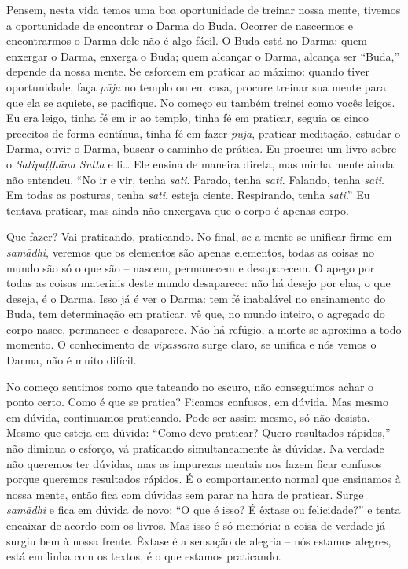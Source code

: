 Pensem, nesta vida temos uma boa oportunidade de treinar nossa
mente, tivemos a oportunidade de encontrar o Darma do Buda. Ocorrer de
nascermos e encontrarmos o Darma dele não é algo fácil. O Buda está no
Darma: quem enxergar o Darma, enxerga o Buda; quem alcançar o Darma,
alcança ser “Buda,” depende da nossa mente. Se esforcem em praticar ao
máximo: quando tiver oportunidade, faça \emph{pūja} no templo ou em
casa, procure treinar sua mente para que ela se aquiete, se pacifique.
No começo eu também treinei como vocês leigos. Eu era leigo, tinha fé
em ir ao templo, tinha fé em praticar, seguia os cinco preceitos de
forma contínua, tinha fé em fazer \emph{pūja}, praticar meditação,
estudar o Darma, ouvir o Darma, buscar o caminho de prática. Eu
procurei um livro sobre o \emph{Satipaṭṭhāna Sutta} e li\ldots{} Ele
ensina de maneira direta, mas minha mente ainda não entendeu. “No ir e
vir, tenha \emph{sati}. Parado, tenha \emph{sati}. Falando, tenha
\emph{sati}. Em todas as posturas, tenha \emph{sati}, esteja
ciente. Respirando, tenha \emph{sati}.” Eu tentava praticar, mas
ainda não enxergava que o corpo é apenas corpo. 

Que fazer? Vai praticando, praticando. No final, se a mente se
unificar firme em \emph{samādhi}, veremos que os elementos são
apenas elementos, todas as coisas no mundo são só o que são – nascem,
permanecem e desaparecem. O apego por todas as coisas materiais deste
mundo desaparece: não há desejo por elas, o que deseja, é o Darma. Isso
já é ver o Darma: tem fé inabalável no ensinamento do Buda, tem
determinação em praticar, vê que, no mundo inteiro, o agregado do corpo
nasce, permanece e desaparece. Não há refúgio, a morte se aproxima a
todo momento. O conhecimento de \emph{vipassanā} surge claro, se
unifica e nós vemos o Darma, não é muito difícil. 

No começo sentimos como que tateando no escuro, não conseguimos
achar o ponto certo. Como é que se pratica? Ficamos confusos, em
dúvida. Mas mesmo em dúvida, continuamos praticando. Pode ser assim
mesmo, só não desista. Mesmo que esteja em dúvida: “Como devo praticar?
Quero resultados rápidos,” não diminua o esforço, vá praticando
simultaneamente às dúvidas. Na verdade não queremos ter dúvidas, mas as
impurezas mentais nos fazem ficar confusos porque queremos resultados
rápidos. É o comportamento normal que ensinamos à nossa mente, então
fica com dúvidas sem parar na hora de praticar. Surge
\emph{samādhi} e fica em dúvida de novo: “O que é isso? É êxtase ou
felicidade?” e tenta encaixar de acordo com os livros. Mas isso é só
memória: a coisa de verdade já surgiu bem à nossa frente. Êxtase é a
sensação de alegria – nós estamos alegres, está em linha com os textos,
é o que estamos praticando. 

